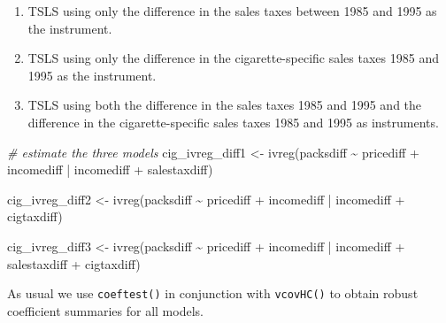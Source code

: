 \documentclass[
  14pt,
]{memoir}
\newenvironment{Shaded}{\begin{snugshade}}{\end{snugshade}}
\newcommand{\CommentTok}[1]{\textcolor[rgb]{0.56,0.35,0.01}{\textit{#1}}}
\newcommand{\FunctionTok}[1]{\textcolor[rgb]{0.00,0.00,0.00}{#1}}
\newcommand{\NormalTok}[1]{#1}
\newcommand{\OtherTok}[1]{\textcolor[rgb]{0.56,0.35,0.01}{#1}}
\newcommand{\SpecialCharTok}[1]{\textcolor[rgb]{0.00,0.00,0.00}{#1}}
\begin{document}
\begin{enumerate}
\def\labelenumi{\arabic{enumi}.}
\item
  TSLS using only the difference in the sales taxes between 1985 and 1995 as the instrument.
\item
  TSLS using only the difference in the cigarette-specific sales taxes 1985 and 1995 as the instrument.
\item
  TSLS using both the difference in the sales taxes 1985 and 1995 and the difference in the cigarette-specific sales taxes 1985 and 1995 as instruments.
\end{enumerate}

\begin{Shaded}
\begin{Highlighting}[]
\CommentTok{\# estimate the three models}
\NormalTok{cig\_ivreg\_diff1 }\OtherTok{\textless{}{-}} \FunctionTok{ivreg}\NormalTok{(packsdiff }\SpecialCharTok{\textasciitilde{}}\NormalTok{ pricediff }\SpecialCharTok{+} 
\NormalTok{                           incomediff }\SpecialCharTok{|}\NormalTok{ incomediff }\SpecialCharTok{+} 
\NormalTok{                         salestaxdiff)}

\NormalTok{cig\_ivreg\_diff2 }\OtherTok{\textless{}{-}} \FunctionTok{ivreg}\NormalTok{(packsdiff }\SpecialCharTok{\textasciitilde{}}\NormalTok{ pricediff }\SpecialCharTok{+} 
\NormalTok{                           incomediff }\SpecialCharTok{|}\NormalTok{ incomediff }\SpecialCharTok{+} 
\NormalTok{                         cigtaxdiff)}

\NormalTok{cig\_ivreg\_diff3 }\OtherTok{\textless{}{-}} \FunctionTok{ivreg}\NormalTok{(packsdiff }\SpecialCharTok{\textasciitilde{}}\NormalTok{ pricediff }\SpecialCharTok{+} 
\NormalTok{                           incomediff }\SpecialCharTok{|}\NormalTok{ incomediff }\SpecialCharTok{+} 
\NormalTok{                         salestaxdiff }\SpecialCharTok{+}\NormalTok{ cigtaxdiff)}
\end{Highlighting}
\end{Shaded}

As usual we use \texttt{coeftest()} in conjunction with \texttt{vcovHC()} to obtain robust coefficient summaries for all models.
\end{document}
